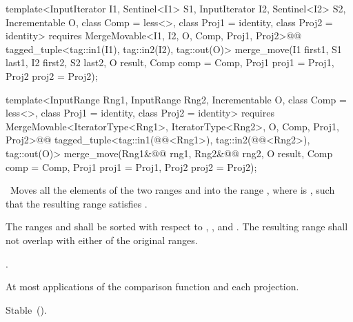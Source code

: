 \begin{addedblock}
%
\begin{itemdecl}
template<InputIterator I1, Sentinel<I1> S1, InputIterator I2, Sentinel<I2> S2,
    Incrementable O, class Comp = less<>, class Proj1 = identity,
    class Proj2 = identity>
  requires MergeMovable<I1, I2, O, Comp, Proj1, Proj2>@\newtxt{()}@
  tagged_tuple<tag::in1(I1), tag::in2(I2), tag::out(O)>
    merge_move(I1 first1, S1 last1, I2 first2, S2 last2, O result,
               Comp comp = Comp{}, Proj1 proj1 = Proj1{}, Proj2 proj2 = Proj2{});

template<InputRange Rng1, InputRange Rng2, Incrementable O, class Comp = less<>,
    class Proj1 = identity, class Proj2 = identity>
  requires MergeMovable<IteratorType<Rng1>, IteratorType<Rng2>, O, Comp, Proj1, Proj2>@\newtxt{()}@
  tagged_tuple<tag::in1(@@<Rng1>),
               tag::in2(@@<Rng2>),
               tag::out(O)>
    merge_move(Rng1&@\newtxt{\&}@ rng1, Rng2&@\newtxt{\&}@ rng2, O result,
               Comp comp = Comp{}, Proj1 proj1 = Proj1{}, Proj2 proj2 = Proj2{});
\end{itemdecl}

\begin{itemdescr}
\pnum
\effects\ Moves all the elements of the two ranges  and
 into the range , where 
is , such that the resulting range satisfies
.

\pnum
\requires The ranges  and  shall be
sorted with respect to , , and .
The resulting range shall not overlap with either of the original ranges.

\pnum
\returns
{}.

\pnum
\complexity
At most
applications of the comparison function and each projection.

\pnum
\remarks Stable~().
\end{itemdescr}
\end{addedblock}

